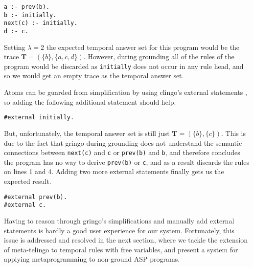 \begin{lstlisting}[language=clingo]
a :- prev(b).
b :- initially.
next(c) :- initially.
d :- c.
\end{lstlisting}

Setting $\lambda=2$ the expected temporal answer set for this program
would be the trace $\bm{T}=(\{ b \},\{ a, c, d \})$. However, during
grounding all of the rules of the program would be discarded as
\verb|initially| does not occur in any rule head, and so we would get
an empty trace as the temporal answer set.

Atoms can be guarded from simplification by using clingo's external
statements \cite{PotasscoUserGuide19}, so adding the following
additional statement should help.

\begin{lstlisting}[language=clingo,numbers=none]
#external initially.
\end{lstlisting}

But, unfortunately, the temporal answer set is still just
$\bm{T}=(\{ b \},\{ c \})$. This is due to the fact that gringo during
grounding does not understand the semantic connections between
\verb|next(c)| and \verb|c| or \verb|prev(b)| and \verb|b|, and
therefore concludes the program has no way to derive \verb|prev(b)| or
\verb|c|, and as a result discards the rules on lines 1 and 4. Adding
two more external statements finally gets us the expected result.

\begin{lstlisting}[language=clingo,numbers=none]
#external prev(b).
#external c.
\end{lstlisting}

Having to reason through gringo's simplifications and manually add
external statements is hardly a good user experience for our
system. Fortunately, this issue is addressed and resolved in the next
section, where we tackle the extension of meta-telingo to temporal rules with
free variables, and present a system for applying metaprogramming to
non-ground ASP programs.
